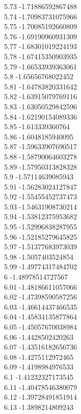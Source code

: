 {5.73	-1.71886592867488\\
5.74	-1.70983731075966\\
5.75	-1.70085192660809\\
5.76	-1.69190960931309\\
5.77	-1.68301019224193\\
5.78	-1.67415350903935\\
5.79	-1.66533939363061\\
5.8	-1.65656768022452\\
5.81	-1.64783820331642\\
5.82	-1.63915079769116\\
5.83	-1.63050529842596\\
5.84	-1.62190154089336\\
5.85	-1.613339360764\\
5.86	-1.6048185940095\\
5.87	-1.59633907690517\\
5.88	-1.58790064603278\\
5.89	-1.57950313828328\\
5.9	-1.57114639085943\\
5.91	-1.56283024127847\\
5.92	-1.55455452737473\\
5.93	-1.54631908730214\\
5.94	-1.53812375953682\\
5.95	-1.52996838287955\\
5.96	-1.52185279645825\\
5.97	-1.51377683973039\\
5.98	-1.5057403524854\\
5.99	-1.49774317484702\\
6	-1.48978514727567\\
6.01	-1.48186611057066\\
6.02	-1.47398590587256\\
6.03	-1.46614437466535\\
6.04	-1.45834135877864\\
6.05	-1.45057670038984\\
6.06	-1.4428502420263\\
6.07	-1.43516182656736\\
6.08	-1.4275112972465\\
6.09	-1.4198984976533\\
6.1	-1.41232327173545\\
6.11	-1.40478546380079\\
6.12	-1.39728491851914\\
6.13	-1.3898214809243\\
}
